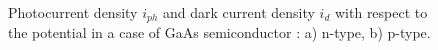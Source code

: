\begin{figure}[h]
    \centering
    
    \caption{Photocurrent density $i_{ph}$ and dark current density 
    $i_d$ with respect to the potential in a case of GaAs semiconductor 
    \citep{plieth2008}: a) n-type, b) p-type.}
    \label{fig_photocurrent_plieth}
\end{figure}
